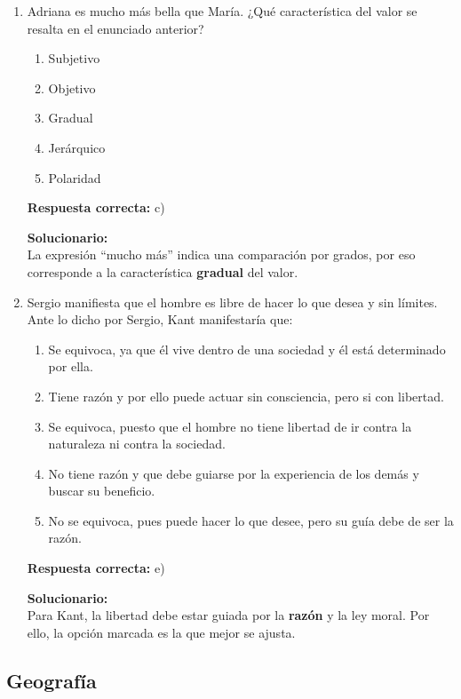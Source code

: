 \begin{enumerate}
	\item Adriana es mucho más bella que María. ¿Qué característica del valor se resalta en el enunciado anterior?
	\begin{enumerate}[label=\alph*)]
		\item Subjetivo
		\item Objetivo
		\item Gradual
		\item Jerárquico
		\item Polaridad
	\end{enumerate}
	\textbf{Respuesta correcta:} c)
	
	\vspace{2mm}
	\textbf{Solucionario:}\\
	La expresión “mucho más” indica una comparación por grados, por eso corresponde a la característica \textbf{gradual} del valor.
	
	\vspace{6mm}
	
	\item Sergio manifiesta que el hombre es libre de hacer lo que desea y sin límites. Ante lo dicho por Sergio, Kant manifestaría que:
	\begin{enumerate}[label=\alph*)]
		\item Se equivoca, ya que él vive dentro de una sociedad y él está determinado por ella.
		\item Tiene razón y por ello puede actuar sin consciencia, pero si con libertad.
		\item Se equivoca, puesto que el hombre no tiene libertad de ir contra la naturaleza ni contra la sociedad.
		\item No tiene razón y que debe guiarse por la experiencia de los demás y buscar su beneficio.
		\item No se equivoca, pues puede hacer lo que desee, pero su guía debe de ser la razón.
	\end{enumerate}
	\textbf{Respuesta correcta:} e)
	
	\vspace{2mm}
	\textbf{Solucionario:}\\
	Para Kant, la libertad debe estar guiada por la \textbf{razón} y la ley moral. Por ello, la opción marcada es la que mejor se ajusta.
	
	\vspace{6mm}
	
\end{enumerate}

\subsection*{Geografía}

